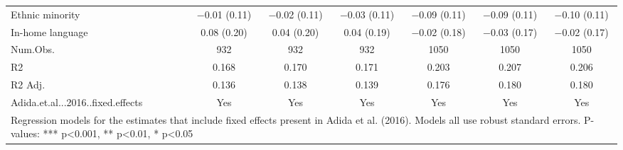 \begin{table}
\begin{tabular}[t]{lcccccc}
Ethnic minority & \num{-0.01} (\num{0.11}) & \num{-0.02} (\num{0.11}) & \num{-0.03} (\num{0.11}) & \num{-0.09} (\num{0.11}) & \num{-0.09} (\num{0.11}) & \num{-0.10} (\num{0.11})\\
In-home language & \num{0.08} (\num{0.20}) & \num{0.04} (\num{0.20}) & \num{0.04} (\num{0.19}) & \num{-0.02} (\num{0.18}) & \num{-0.03} (\num{0.17}) & \num{-0.02} (\num{0.17})\\
\midrule
Num.Obs. & \num{932} & \num{932} & \num{932} & \num{1050} & \num{1050} & \num{1050}\\
R2 & \num{0.168} & \num{0.170} & \num{0.171} & \num{0.203} & \num{0.207} & \num{0.206}\\
R2 Adj. & \num{0.136} & \num{0.138} & \num{0.139} & \num{0.176} & \num{0.180} & \num{0.180}\\
Adida.et.al...2016..fixed.effects & Yes & Yes & Yes & Yes & Yes & Yes\\
\bottomrule
\multicolumn{7}{l}{\rule{0pt}{1em}Regression models for the estimates that include fixed effects present in Adida et al. (2016). Models all use robust standard errors. P-values: *** p<0.001, ** p<0.01, * p<0.05}\\
\end{tabular}
\end{table}
